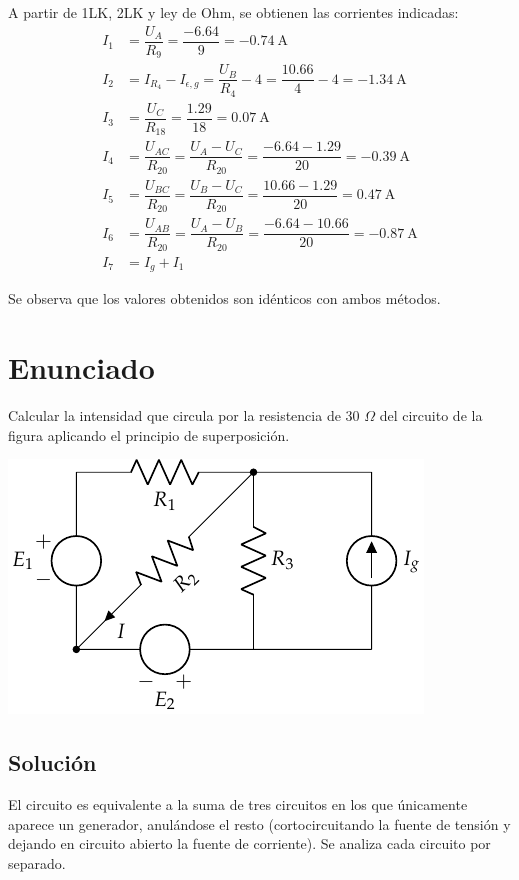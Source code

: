      A partir de 1LK, 2LK y ley de Ohm, se obtienen las corrientes
     indicadas:
     \begin{align*}
       I_1&=\dfrac{U_A}{R_9}=\dfrac{-6.64}{9}=\qty{-0.74}{\ampere}\\[7pt]
       I_2&= I_{R_4}-I_{\epsilon,g}=\dfrac{U_B}{R_4}-4=\dfrac{10.66}{4}-4=\qty{-1.34}{\ampere}\\[7pt]
       I_3&=\dfrac{U_C}{R_{18}}=\dfrac{1.29}{18}=\qty{0.07}{\ampere}\\[7pt]
       I_4&=\dfrac{U_{AC}}{R_{20}}=\dfrac{U_A-U_C}{R_{20}}=\dfrac{-6.64-1.29}{20}=\qty{-0.39}{\ampere}\\[7pt]
       I_5&=\dfrac{U_{BC}}{R_{20}}=\dfrac{U_B-U_C}{R_{20}}=\dfrac{10.66-1.29}{20}=\qty{0.47}{\ampere}\\[7pt]
       I_6&=\dfrac{U_{AB}}{R_{20}}=\dfrac{U_A-U_B}{R_{20}}=\dfrac{-6.64-10.66}{20}=\qty{-0.87}{\ampere}\\[7pt]
       I_7&=I_g+I_1
     \end{align*}

     Se observa que los valores obtenidos son idénticos con ambos
     métodos.
     \section{Enunciado}
     Calcular la intensidad que circula por la resistencia de 30
     $\Omega$ del circuito de la figura aplicando el principio de
     superposición.

\begin{center}
  \includegraphics{figuras/BT1_16.pdf}
\end{center}

\subsection*{Solución}
El circuito es equivalente a la suma de tres circuitos en los que
únicamente aparece un generador, anulándose el resto (cortocircuitando
la fuente de tensión y dejando en circuito abierto la fuente de
corriente). Se analiza cada circuito por separado.

